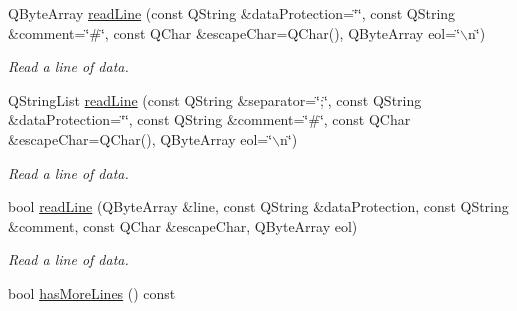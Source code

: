 \begin{DoxyCompactItemize}
QByteArray \hyperlink{classmdt_csv_file_aa7d5e7ab9d6d71f7ca1c9fe7bea043a3}{readLine} (const QString \&dataProtection=\char`\"{}\char`\"{}, const QString \&comment=\char`\"{}\#\char`\"{}, const QChar \&escapeChar=QChar(), QByteArray eol=\char`\"{}$\backslash$n\char`\"{})
\begin{DoxyCompactList}\small\item\em Read a line of data. \end{DoxyCompactList}\item 
QStringList \hyperlink{classmdt_csv_file_a0c16f0024802eb675872aef129317eb8}{readLine} (const QString \&separator=\char`\"{};\char`\"{}, const QString \&dataProtection=\char`\"{}\char`\"{}, const QString \&comment=\char`\"{}\#\char`\"{}, const QChar \&escapeChar=QChar(), QByteArray eol=\char`\"{}$\backslash$n\char`\"{})
\begin{DoxyCompactList}\small\item\em Read a line of data. \end{DoxyCompactList}\item 
bool \hyperlink{classmdt_csv_file_a56c5d054c044cba2e4d617f5185a13ed}{readLine} (QByteArray \&line, const QString \&dataProtection, const QString \&comment, const QChar \&escapeChar, QByteArray eol)
\begin{DoxyCompactList}\small\item\em Read a line of data. \end{DoxyCompactList}\item 
\hypertarget{classmdt_csv_file_a1e8fa47acbbbf4e5fc7715e80e20d59b}{
bool \hyperlink{classmdt_csv_file_a1e8fa47acbbbf4e5fc7715e80e20d59b}{hasMoreLines} () const }
\label{classmdt_csv_file_a1e8fa47acbbbf4e5fc7715e80e20d59b}


\end{DoxyCompactItemize}
